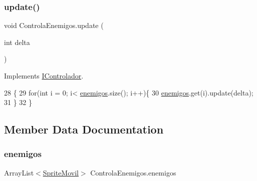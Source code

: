 \subsubsection{\texorpdfstring{update()}{update()}}
{\footnotesize\ttfamily void Controla\+Enemigos.\+update (\begin{DoxyParamCaption}\item[{int}]{delta }\end{DoxyParamCaption})\hspace{0.3cm}{\ttfamily [inline]}}



Implements \mbox{\hyperlink{interface_i_controlador_a06ccd4613ae1662a3a45620104c5224b}{I\+Controlador}}.


\begin{DoxyCode}
28                                   \{
29         \textcolor{keywordflow}{for}(\textcolor{keywordtype}{int} i = 0; i< \mbox{\hyperlink{class_controla_enemigos_a00bc1b9f42ef341339d0d7a00ed60319}{enemigos}}.size(); i++)\{
30             \mbox{\hyperlink{class_controla_enemigos_a00bc1b9f42ef341339d0d7a00ed60319}{enemigos}}.get(i).update(delta);
31         \}
32     \}
\end{DoxyCode}


\subsection{Member Data Documentation}
\mbox{\label{class_controla_enemigos_a00bc1b9f42ef341339d0d7a00ed60319}} 
\subsubsection{\texorpdfstring{enemigos}{enemigos}}
{\footnotesize\ttfamily Array\+List$<$\mbox{\hyperlink{class_sprite_movil}{Sprite\+Movil}}$>$ Controla\+Enemigos.\+enemigos\hspace{0.3cm}{\ttfamily [private]}}

